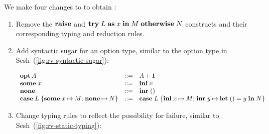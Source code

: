 \documentclass[acmsmall,review,anonymous]{acmart}
\begin{document}
We make four changes to \affineEGV to obtain \affineAGV:
\begin{enumerate}
\item
  Remove the $ \relax{\mathbf{raise}}$ and $ \relax{\mathbf{try}}\;\relax{L}\;\relax{\mathbf{as}}\;\relax{x}\; \relax{\mathbf{in}}\;\relax{M}\;\relax{\mathbf{otherwise}}\;\relax{N}$ constructs and their corresponding typing and reduction rules.
\item
  Add syntactic sugar for an option type, similar to the option type in Sesh~(\cref{fig:rv-syntactic-sugar}):
  \\
  \begin{minipage}{1.0\linewidth}
    \[%
      \begin{array}{lcl}%
        \gvTyOpt{A} &::=& \gvTySum{A}{\gvTyUnit}
        \\
        \gvSome{x} &::=& \gvInl{x}
        \\
        \gvNone &::=& \gvInr{\gvUnit}
        \\
        \gvCaseOpt{L}{x}{M}{N} &::=& \gvCaseSum{L}{x}{M}{y}{\gvLetUnit{y}{N}}
      \end{array}
    \]
  \end{minipage}
\item
  Change typing rules to reflect the possibility for failure, similar to Sesh~(\cref{fig:rv-static-typing}):
  \begin{center}
    \begin{prooftree*}
    \end{prooftree*}%
    \begin{prooftree*}
    \end{prooftree*}
  \end{center}
  \begin{center}
    \begin{prooftree*}
    \end{prooftree*}%
    \begin{prooftree*}

\end{prooftree*}
\end{center}
\end{enumerate}
\end{document}
